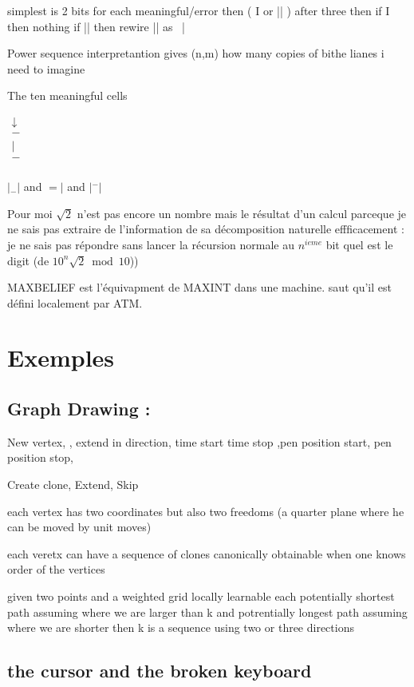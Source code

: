 \documentclass{article}
\begin{document}
simplest is 2 bits for each meaningful/error then ( I or || )  after three 
then if I then nothing if || then rewire || as  | 

Power sequence  interpretantion gives (n,m) how many copies of bithe lianes i need to imagine 
 

The ten meaningful cells

$\begin{matrix}
\downarrow&&\\
-&& &\\
|\quad&&\\
- &&\\
\end{matrix}$

$|_-|$ and $=|$ and $|^-|$ 

 Pour moi $\sqrt{2}$ n'est pas encore un nombre mais le résultat d'un calcul parceque je ne sais pas extraire de l'information de sa décomposition naturelle effficacement : je ne sais pas répondre sans lancer la récursion normale au $n^{ieme}$ bit quel est le digit  (de $10^n \sqrt{2} \bmod 10$))

MAXBELIEF est l'équivapment de MAXINT dans une machine. saut qu'il est défini localement par ATM.


\section{Exemples}
\subsection{Graph Drawing :} 
New vertex, , extend in direction, time start time stop  ,pen position start, pen position stop, 

Create clone, 
Extend,
Skip

each vertex has two coordinates but also two freedoms (a quarter plane where he can be moved by unit moves)

each veretx can have a sequence of clones canonically obtainable when one knows order of the vertices

given two points and a  weighted grid locally learnable each potentially shortest path assuming where we are larger than k  and 
potrentially longest path assuming where we are shorter then k is a sequence  using two or three directions


\subsection{ the cursor and the broken keyboard }
\end{document}
